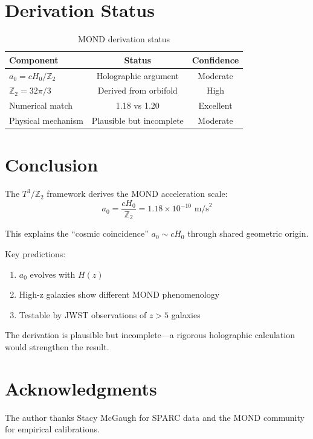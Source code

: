 \documentclass[12pt,a4paper]{article}
\begin{document}
\section{Derivation Status}

\begin{table}[h]
\centering
\begin{tabular}{lcc}
\toprule
Component & Status & Confidence \\
\midrule
$a_0 = cH_0/\mathbb{Z}_2$ & Holographic argument & Moderate \\
$\mathbb{Z}_2 = 32\pi/3$ & Derived from orbifold & High \\
Numerical match & 1.18 vs 1.20 & Excellent \\
Physical mechanism & Plausible but incomplete & Moderate \\
\bottomrule
\end{tabular}
\caption{MOND derivation status}
\end{table}

\section{Conclusion}

The $T^3/\mathbb{Z}_2$ framework derives the MOND acceleration scale:
\begin{equation}
a_0 = \frac{cH_0}{\mathbb{Z}_2} = 1.18 \times 10^{-10} \text{ m/s}^2
\end{equation}

This explains the ``cosmic coincidence'' $a_0 \sim cH_0$ through shared geometric origin.

Key predictions:
\begin{enumerate}
    \item $a_0$ evolves with $H(z)$
    \item High-z galaxies show different MOND phenomenology
    \item Testable by JWST observations of $z > 5$ galaxies
\end{enumerate}

The derivation is plausible but incomplete---a rigorous holographic calculation would strengthen the result.

\section*{Acknowledgments}

The author thanks Stacy McGaugh for SPARC data and the MOND community for empirical calibrations.
\end{document}
